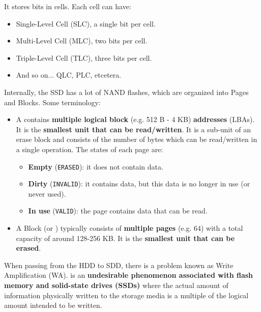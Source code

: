 \highspace
It stores bits in cells. Each cell can have:
\begin{itemize}
    \item Single-Level Cell (SLC), a single bit per cell.
    \item Multi-Level Cell (MLC), two bits per cell.
    \item Triple-Level Cell (TLC), three bits per cell.
    \item And so on... QLC, PLC, etcetera.
\end{itemize}
Internally, the SSD has a lot of NAND flashes, which are organized into Pages and Blocks. Some terminology:
\begin{itemize}
    \item A  contains \textbf{multiple logical block} (e.g. 512 B - 4 KB) \textbf{addresses} (LBAs). It is the \textbf{smallest unit that can be read/written}. It is a sub-unit of an erase block and consists of the number of bytes which can be read/written in a single operation. The states of each page are:
    \begin{itemize}
        \item {} \textbf{Empty} (\texttt{ERASED}): it does not contain data.
        \item {} \textbf{Dirty} (\texttt{INVALID}): it contains data, but this data is no longer in use (or never used).
        \item {} \textbf{In use} (\texttt{VALID}): the page contains data that can be read.
    \end{itemize}

    \item A Block (or ) typically consists of \textbf{multiple pages} (e.g. 64) with a total capacity of around 128-256 KB. It is the \textbf{smallest unit that can be erased}.
\end{itemize}

\highspace
When passing from the HDD to SDD, there is a problem known as Write Amplification (WA). \label{Write amplification (WA)} is an \textbf{undesirable phenomenon associated with flash memory and solid-state drives (SSDs)} where the actual amount of information physically written to the storage media is a multiple of the logical amount intended to be written.

